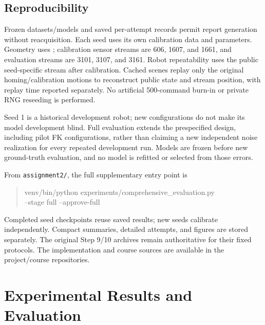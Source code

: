 \documentclass[11pt,letterpaper]{article}
\begin{document}
\subsection{Reproducibility}
Frozen datasets/models and saved per-attempt records permit report generation without reacquisition. Each seed uses its own calibration data and parameters. Geometry uses ; calibration sensor streams are 606, 1607, and 1661, and evaluation streams are 3101, 3107, and 3161. Robot repeatability uses the public seed-specific stream after calibration. Cached scenes replay only the original homing/calibration motions to reconstruct public state and stream position, with replay time reported separately. No artificial 500-command burn-in or private RNG reseeding is performed.

Seed 1 is a historical development robot; new configurations do not make its model development blind. Full evaluation extends the prespecified design, including pilot FK configurations, rather than claiming a new independent noise realization for every repeated development run. Models are frozen before new ground-truth evaluation, and no model is refitted or selected from those errors.

From \texttt{assignment2/}, the full supplementary entry point is
\begin{quote}\small\ttfamily
venv/bin/python experiments/comprehensive\_evaluation.py\\
\hspace*{1em}--stage full --approve-full
\end{quote}
Completed seed checkpoints reuse saved results; new seeds calibrate independently. Compact summaries, detailed attempts, and figures are stored separately. The original Step 9/10 archives remain authoritative for their fixed protocols. The implementation and course sources are available in the project/course repositories.

\section{Experimental Results and Evaluation}\label{sec:results}
\end{document}
